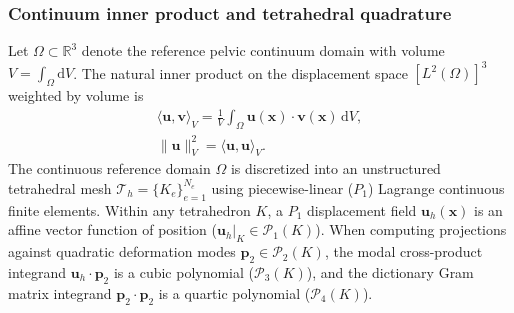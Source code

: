 \documentclass[pdflatex,sn-basic]{sn-jnl}
\begin{document}
\subsubsection{Continuum inner product and tetrahedral quadrature}
Let $\Omega \subset \mathbb{R}^3$ denote the reference pelvic continuum domain with volume $V = \int_\Omega \mathrm{d}V$.
The natural inner product on the displacement space $[L^2(\Omega)]^3$ weighted by volume is
\begin{equation}
\begin{gathered}
\langle \mathbf u, \mathbf v \rangle_V = \frac{1}{V} \int_\Omega \mathbf u(\mathbf x) \cdot \mathbf v(\mathbf x) \, \mathrm{d}V, \\
\|\mathbf u\|_V^2 = \langle \mathbf u, \mathbf u \rangle_V.
\label{eq:volume-inner-product}
\end{gathered}
\end{equation}
The continuous reference domain $\Omega$ is discretized into an unstructured tetrahedral mesh $\mathcal{T}_h = \{K_e\}_{e=1}^{N_e}$ using piecewise-linear ($P_1$) Lagrange continuous finite elements.
Within any tetrahedron $K$, a $P_1$ displacement field $\mathbf u_h(\mathbf x)$ is an affine vector function of position ($\mathbf u_h|_K \in \mathcal{P}_1(K)$).
When computing projections against quadratic deformation modes $\mathbf p_2 \in \mathcal{P}_2(K)$, the modal cross-product integrand $\mathbf u_h \cdot \mathbf p_2$ is a cubic polynomial ($\mathcal{P}_3(K)$), and the dictionary Gram matrix integrand $\mathbf p_2 \cdot \mathbf p_2$ is a quartic polynomial ($\mathcal{P}_4(K)$).
\end{document}
